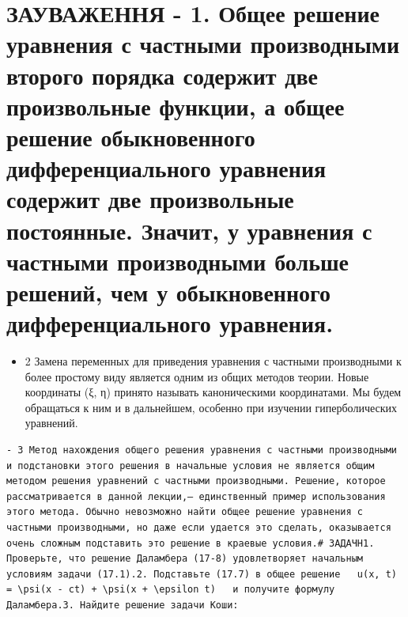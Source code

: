 \documentclass[
  ukrainian,
]{article}
\providecommand{\tightlist}{%
  \setlength{\itemsep}{0pt}\setlength{\parskip}{0pt}}
\begin{document}
\section{ЗАУВАЖЕННЯ - 1. Общее решение уравнения с частными производными
второго порядка содержит две произвольные функции, а общее решение
обыкновенного дифференциального уравнения содержит две произвольные
постоянные. Значит, у уравнения с частными производными больше решений,
чем у обыкновенного дифференциального
уравнения.}\label{ux437ux430ux443ux432ux430ux436ux435ux43dux43dux44f---1.-ux43eux431ux449ux435ux435-ux440ux435ux448ux435ux43dux438ux435-ux443ux440ux430ux432ux43dux435ux43dux438ux44f-ux441-ux447ux430ux441ux442ux43dux44bux43cux438-ux43fux440ux43eux438ux437ux432ux43eux434ux43dux44bux43cux438-ux432ux442ux43eux440ux43eux433ux43e-ux43fux43eux440ux44fux434ux43aux430-ux441ux43eux434ux435ux440ux436ux438ux442-ux434ux432ux435-ux43fux440ux43eux438ux437ux432ux43eux43bux44cux43dux44bux435-ux444ux443ux43dux43aux446ux438ux438-ux430-ux43eux431ux449ux435ux435-ux440ux435ux448ux435ux43dux438ux435-ux43eux431ux44bux43aux43dux43eux432ux435ux43dux43dux43eux433ux43e-ux434ux438ux444ux444ux435ux440ux435ux43dux446ux438ux430ux43bux44cux43dux43eux433ux43e-ux443ux440ux430ux432ux43dux435ux43dux438ux44f-ux441ux43eux434ux435ux440ux436ux438ux442-ux434ux432ux435-ux43fux440ux43eux438ux437ux432ux43eux43bux44cux43dux44bux435-ux43fux43eux441ux442ux43eux44fux43dux43dux44bux435.-ux437ux43dux430ux447ux438ux442-ux443-ux443ux440ux430ux432ux43dux435ux43dux438ux44f-ux441-ux447ux430ux441ux442ux43dux44bux43cux438-ux43fux440ux43eux438ux437ux432ux43eux434ux43dux44bux43cux438-ux431ux43eux43bux44cux448ux435-ux440ux435ux448ux435ux43dux438ux439-ux447ux435ux43c-ux443-ux43eux431ux44bux43aux43dux43eux432ux435ux43dux43dux43eux433ux43e-ux434ux438ux444ux444ux435ux440ux435ux43dux446ux438ux430ux43bux44cux43dux43eux433ux43e-ux443ux440ux430ux432ux43dux435ux43dux438ux44f.}

\begin{itemize}
\tightlist
\item
  2 Замена переменных для приведения уравнения с частными производными к
  более простому виду является одним из общих методов теории. Новые
  координаты (ξ, η) принято называть каноническими координатами. Мы
  будем обращаться к ним и в дальнейшем, особенно при изучении
  гиперболических уравнений.
\end{itemize}

\begin{verbatim}
- 3 Метод нахождения общего решения уравнения с частными производными и подстановки этого решения в начальные условия не является общим методом решения уравнений с частными производными. Решение, которое рассматривается в данной лекции,— единственный пример использования этого метода. Обычно невозможно найти общее решение уравнения с частными производными, но даже если удается это сделать, оказывается очень сложным подставить это решение в краевые условия.# ЗАДАЧН1. Проверьте, что решение Даламбера (17-8) удовлетворяет начальным условиям задачи (17.1).2. Подставьте (17.7) в общее решение   u(x, t) = \psi(x - ct) + \psi(x + \epsilon t)   и получите формулу Даламбера.3. Найдите решение задачи Коши:
\end{verbatim}
\end{document}
